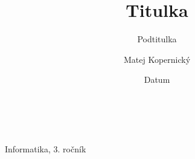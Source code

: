 \documentclass[red]{beamer}
\begin{document}
\large

\title{Titulka}
\subtitle{Podtitulka}
\author{Matej Kopernický}
\date{Datum}

{
\begin{frame}[plain,t]
\begin{center}
\color{white}
\vspace{1.9cm}
\huge\inserttitle
\vspace{0.9cm}
\Large\insertsubtitle\\
\vspace{1.75cm}
\color{black}
\large\insertauthor\\
\bigskip
Informatika, 3. ročník
\end{center}
\end{frame}
}
\end{document}
